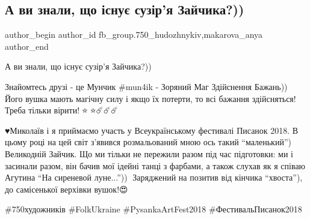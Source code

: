  
 
 
 
 

\subsection{А ви знали, що існує сузір'я Зайчика?))}
\label{sec:02_04_2018.fb.fb_group.750_hudozhnykiv.1.suzirja_zajchika}
 
\ifcmt
 author_begin
   author_id fb_group.750_hudozhnykiv,makarova_anya
 author_end
\fi

А ви знали, що існує сузір'я Зайчика?))

Знайомтесь друзі - це Мунчик \#mun4ik - Зоряний Маг Здійснення Бажань))🐰 Його
вушка мають магічну силу і якщо їх потерти, то всі бажання здійсняться! Треба
тільки вірити!🌟⭐🌟⭐☄️☄️☄️ 

♥️Миколаїв і я приймаємо участь у Всеукраїнському фестивалі Писанок 2018. В
цьому році на цей світ з'явився розмальований мною ось такий \enquote{маленький})
Великодній Зайчик. Що ми тільки не пережили разом під час підготовки: ми і
засинали разом, він бачив мої ідейні танці з фарбами, а також слухав як я
співаю Агутина \enquote{На сиреневой луне...}))🤣 Заряджений на позитив від кінчика
\enquote{хвоста}), до самісенької верхівки вушок!😍🤗

\#750художників \#FolkUkraine \#PysankaArtFest2018 \#ФестивальПисанок2018

